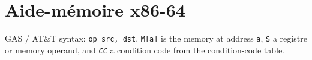 %
\clearpage
{}
\setlength{\headwidth}{\textwidth}
\section*{Aide-mémoire x86-64}

\begingroup
\footnotesize
\setlength{\tabcolsep}{4pt}
\setlength{\columnsep}{18pt}
\setlength{\belowbottomsep}{3pt}          %
\renewcommand{\tabularxcolumn}[1]{>{\raggedright\arraybackslash}p{#1}}   %
\raggedcolumns
\raggedright                              %
\newcommand{\sheethead}[1]{%
  \par\medskip\noindent{\small\sffamily\bfseries #1}\par\nopagebreak\smallskip}

\noindent GAS / AT\&T syntax: \texttt{op src, dst}. \texttt{M[a]} is the memory at
address \texttt{a}, \texttt{S} a registre or memory operand, and \texttt{\textit{CC\nocorr}}
a condition code from the condition-code table.

